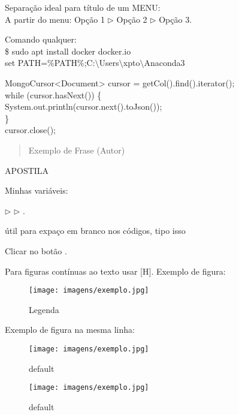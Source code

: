 \documentclass[a4paper,11pt]{article}
\begin{document}
Separação ideal para título de um MENU: \\
A partir do menu: Opção 1 $\triangleright$ Opção 2 $\triangleright$ Opção 3.

Comando qualquer: \\
{\ttfamily\$ sudo apt install docker docker.io} \\
{\ttfamily set PATH=\%PATH\%;C:$\setminus$Users$\setminus$xpto$\setminus$Anaconda3}

{\ttfamily MongoCursor<Document> cursor = getCol().find().iterator(); \\
	while (cursor.hasNext()) \{ \\
	\phantom{x}\hspace{4pt} System.out.println(cursor.next().toJson()); \\
	\} \\
	cursor.close(); }

\begin{quotation}
	Exemplo de Frase (Autor)
\end{quotation}

APOSTILA

\begin{theo}[]{}
	\lipsum[4-1]
\end{theo}

\begin{theo}{}
	\lipsum[4-1]
\end{theo}

Minhas variáveis:

 $\triangleright$  $\triangleright$ .

\aspas{ } útil para expaço em branco nos códigos, tipo isso


Clicar no botão .

Para figuras contínuas ao texto usar [H]. Exemplo de figura:
\begin{figure}[H]
	\centering
	\texttt{[image: imagens/exemplo.jpg]}
	\caption{Legenda}
\end{figure}

Exemplo de figura na mesma linha:

\begin{figure}[ht]
	\begin{minipage}[b]{0.45\linewidth}
		\centering
		\texttt{[image: imagens/exemplo.jpg]}
		\caption{default}
		\label{fig:figure1}
	\end{minipage}
	\hspace{0.5cm}
	\begin{minipage}[b]{0.45\linewidth}
		\centering
		\texttt{[image: imagens/exemplo.jpg]}
		\caption{default}
		\label{fig:figure2}
	\end{minipage}
\end{figure}
\end{document}
